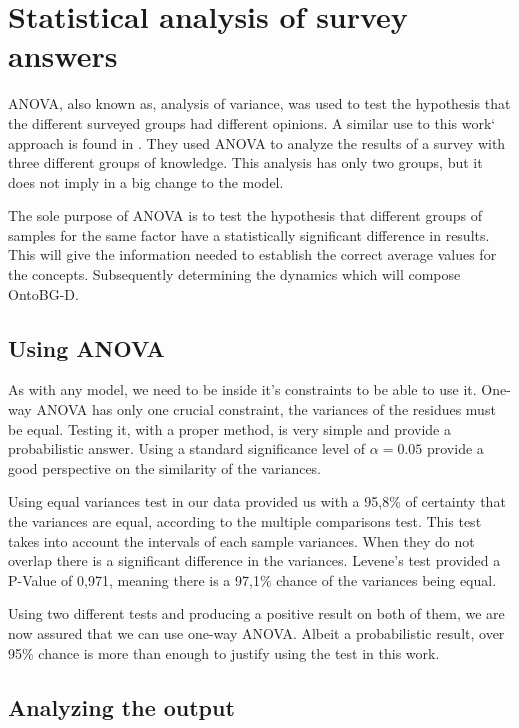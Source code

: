 \section{Statistical analysis of survey answers}

ANOVA, also known as, analysis of variance, was used to test the hypothesis that the different surveyed groups had different opinions. A similar use to this work` approach is found in \cite{ismail2007organizational}. They used ANOVA to analyze the results of a survey with three different groups of knowledge. This analysis has only two groups, but it does not imply in a big change to the model.

The sole purpose of ANOVA is to test the hypothesis that different groups of samples for the same factor have a statistically significant difference in results. This will give the information needed to establish the correct average values for the concepts. Subsequently determining the dynamics which will compose OntoBG-D.

\subsection{Using ANOVA}

As with any model, we need to be inside it's constraints to be able to use it. One-way ANOVA has only one crucial constraint, the variances of the residues must be equal. Testing it, with a proper method, is very simple and provide a probabilistic answer. Using a standard significance level of $\alpha = 0.05$ provide a good perspective on the similarity of the variances.

Using equal variances test in our data provided us with a 95,8\% of certainty that the variances are equal, according to the multiple comparisons test. This test takes into account the intervals of each sample variances. When they do not overlap there is a significant difference in the variances. Levene's test provided a P-Value of 0,971, meaning there is a 97,1\% chance of the variances being equal.

Using two different tests and producing a positive result on both of them, we are now assured that we can use one-way ANOVA. Albeit a probabilistic result, over 95\% chance is more than enough to justify using the test in this work. 


\subsection{Analyzing the output}

